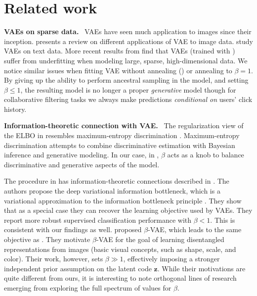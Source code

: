 \documentclass[sigconf]{acmart}
\newcommand{\mathbold}[1]{\ensuremath{\boldsymbol{\mathbf{#1}}}}
\DeclareRobustCommand{\parhead}[1]{\textbf{#1}~}
\newcommand{\mbz}{\mathbold{z}}
\begin{document}
\section{Related work} \label{sec:related}
\parhead{\Glspl{VAE} on sparse data.}
 \Glspl{VAE} \citep{kingma2013auto,rezende2014stochastic} have seen much application to images since their inception. 
\citet{doersch2016tutorial} presents a review on different applications of \gls{VAE} to image data. \citet{miao2016neural} study \gls{VAE}s on text data.
More recent results from \citet{krishnan2017challenge} find that \glspl{VAE} (trained with ) suffer from underfitting when modeling 
large, sparse, high-dimensional data. We notice similar issues when fitting \gls{VAE} without annealing () or annealing to $\beta=1$.  
By giving up the ability to perform ancestral sampling in the model, and setting $\beta \leq 1$, the resulting model is 
no longer a proper \emph{generative} model though for collaborative filtering tasks we always make predictions \emph{conditional on} users' click history.

\parhead{Information-theoretic connection with \gls{VAE}.} 
The regularization view of the \gls{ELBO} in  
resembles maximum-entropy discrimination \citep{jaakkola2000maximum}. 
Maximum-entropy discrimination attempts to combine discriminative estimation with 
Bayesian inference and generative modeling. In our case, in , $\beta$ acts as a knob to balance 
discriminative and generative aspects of the model. 

The procedure in  has information-theoretic connections 
described in \citet{alemi2016deep}. The authors propose the deep variational information bottleneck, which is a variational approximation 
to the information 
bottleneck principle \citep{tishby2000information}. They show that as a special case they can recover the learning objective used
by \glspl{VAE}. They report more robust supervised classification performance 
with $\beta < 1$. This is consistent with our findings as well. 
\citet{higgins2017beta} proposed $\beta$-\gls{VAE}, which leads 
to the same objective as . They motivate $\beta$-\gls{VAE} for the goal of learning disentangled representations
from images (basic visual concepts, such as shape, scale, and color). Their work, however, sets $\beta \gg 1$, effectively imposing 
a stronger independent prior assumption on the latent code $\mbz$. While their motivations are quite different from ours, it is 
interesting to note orthogonal lines of research emerging from exploring the full spectrum of values for $\beta$. 
\end{document}
